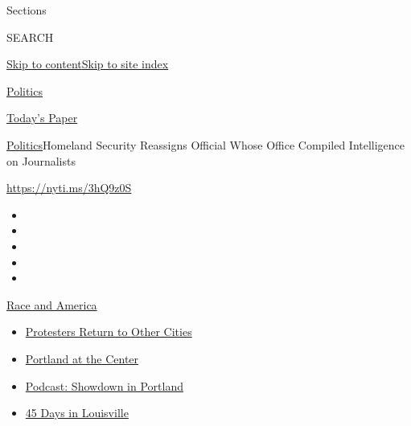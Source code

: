 Sections

SEARCH

\protect\hyperlink{site-content}{Skip to
content}\protect\hyperlink{site-index}{Skip to site index}

\href{https://www.nytimes3xbfgragh.onion/section/politics}{Politics}

\href{https://myaccount.nytimes3xbfgragh.onion/auth/login?response_type=cookie\&client_id=vi}{}

\href{https://www.nytimes3xbfgragh.onion/section/todayspaper}{Today's
Paper}

\href{/section/politics}{Politics}\textbar{}Homeland Security Reassigns
Official Whose Office Compiled Intelligence on Journalists

\url{https://nyti.ms/3hQ9z0S}

\begin{itemize}
\item
\item
\item
\item
\item
\end{itemize}

\href{https://www.nytimes3xbfgragh.onion/news-event/george-floyd-protests-minneapolis-new-york-los-angeles?action=click\&pgtype=Article\&state=default\&region=TOP_BANNER\&context=storylines_menu}{Race
and America}

\begin{itemize}
\tightlist
\item
  \href{https://www.nytimes3xbfgragh.onion/2020/07/26/us/protests-portland-seattle-trump.html?action=click\&pgtype=Article\&state=default\&region=TOP_BANNER\&context=storylines_menu}{Protesters
  Return to Other Cities}
\item
  \href{https://www.nytimes3xbfgragh.onion/2020/07/24/us/portland-oregon-protests-white-race.html?action=click\&pgtype=Article\&state=default\&region=TOP_BANNER\&context=storylines_menu}{Portland
  at the Center}
\item
  \href{https://www.nytimes3xbfgragh.onion/2020/07/23/podcasts/the-daily/portland-protests.html?action=click\&pgtype=Article\&state=default\&region=TOP_BANNER\&context=storylines_menu}{Podcast:
  Showdown in Portland}
\item
  \href{https://www.nytimes3xbfgragh.onion/interactive/2020/07/16/us/black-lives-matter-protests-louisville-breonna-taylor.html?action=click\&pgtype=Article\&state=default\&region=TOP_BANNER\&context=storylines_menu}{45
  Days in Louisville}
\end{itemize}

